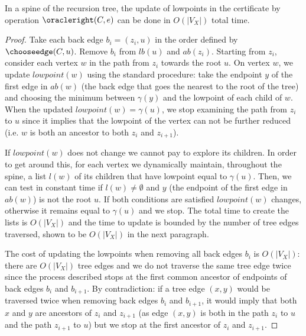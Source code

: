 \begin{lemma}
	In a spine of the recursion tree, the update of lowpoints in
	the certificate by operation $\oracleright(C,e)$ can be done
	in $O(|V_X|)$ total time.  \label{lem:lowpoints}
\end{lemma}
\begin{proof}
	Take each back edge $b_i = (z_i,u)$ in the order defined by
        $\chooseedge(C,u)$. Remove $b_i$ from $lb(u)$ and $ab(z_i)$.
        Starting from $z_i$, consider each vertex $w$ in the path from
        $z_i$ towards the root $u$.  On vertex $w$, we update
        $\mathit{lowpoint}(w)$ using the standard procedure: take the
        endpoint $y$ of the first edge in $ab(w)$ (the back edge that
        goes the nearest to the root of the tree) and choosing the
        minimum between $\gamma(y)$ and the lowpoint of each child of
        $w$.  When the updated $\mathit{lowpoint}(w) = \gamma(u)$, we
        stop examining the path from $z_i$ to $u$ since it implies
        that the lowpoint of the vertex can not be further reduced
        (i.e. $w$ is both an ancestor to both $z_i$ and
        $z_{i+1}$).

	If $\mathit{lowpoint}(w)$ does not change we cannot pay to
	explore its children. In order to get around this, for each
	vertex we dynamically maintain, throughout the spine, a list
	$l(w)$ of its children that have lowpoint equal to
	$\gamma(u)$. Then, we can test in constant time if $l(w) \neq
	\emptyset$ and $y$ (the endpoint of the first edge in $ab(w)$)
	is not the root $u$. If both conditions are satisfied
	$\mathit{lowpoint}(w)$ changes, otherwise it remains equal to
	$\gamma(u)$ and we stop. The total time to create the lists is
	$O(|V_X|)$ and the time to update is bounded by the number of
	tree edges traversed, shown to be $O(|V_X|)$ in the next
	paragraph.

	The cost of updating the lowpoints when removing all
	back edges $b_i$ is $O(|V_X|)$: there are $O(|V_X|)$ tree
	edges and we do not traverse the same tree edge twice since
	the process described stops at the first common ancestor of
	endpoints of back edges $b_i$ and $b_{i+1}$. By contradiction:
	if a tree edge $(x,y)$ would be traversed twice when removing
	back edges $b_i$ and $b_{i+1}$, it would imply that both $x$
	and $y$ are ancestors of $z_i$ and $z_{i+1}$ (as edge $(x,y)$
	is both in the path $z_i$ to $u$ and the path $z_{i+1}$ to
	$u$) but we stop at the first ancestor of $z_i$ and
	$z_{i+1}$.
\end{proof}

